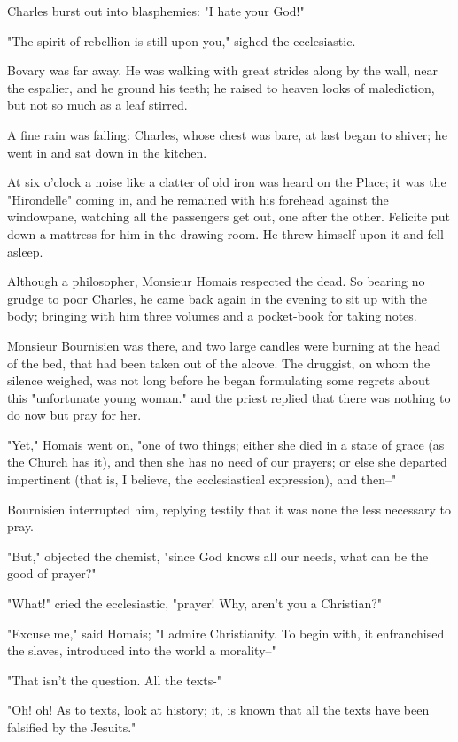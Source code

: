 \documentclass[11pt,twocolumn]{ltugboat}
\begin{document}
Charles burst out into blasphemies: "I hate your God!"

"The spirit of rebellion is still upon you," sighed the ecclesiastic.

Bovary was far away. He was walking with great strides along by the
wall, near the espalier, and he ground his teeth; he raised to heaven
looks of malediction, but not so much as a leaf stirred.

A fine rain was falling: Charles, whose chest was bare, at last began to
shiver; he went in and sat down in the kitchen.

At six o'clock a noise like a clatter of old iron was heard on the
Place; it was the "Hirondelle" coming in, and he remained with his
forehead against the windowpane, watching all the passengers get
out, one after the other. Felicite put down a mattress for him in the
drawing-room. He threw himself upon it and fell asleep.

Although a philosopher, Monsieur Homais respected the dead. So bearing
no grudge to poor Charles, he came back again in the evening to sit up
with the body; bringing with him three volumes and a pocket-book for
taking notes.

Monsieur Bournisien was there, and two large candles were burning at the
head of the bed, that had been taken out of the alcove. The druggist, on
whom the silence weighed, was not long before he began formulating some
regrets about this "unfortunate young woman." and the priest replied
that there was nothing to do now but pray for her.

"Yet," Homais went on, "one of two things; either she died in a state of
grace (as the Church has it), and then she has no need of our prayers;
or else she departed impertinent (that is, I believe, the ecclesiastical
expression), and then--"

Bournisien interrupted him, replying testily that it was none the less
necessary to pray.

"But," objected the chemist, "since God knows all our needs, what can be
the good of prayer?"

"What!" cried the ecclesiastic, "prayer! Why, aren't you a Christian?"

"Excuse me," said Homais; "I admire Christianity. To begin with, it
enfranchised the slaves, introduced into the world a morality--"

"That isn't the question. All the texts-"

"Oh! oh! As to texts, look at history; it, is known that all the texts
have been falsified by the Jesuits."
\end{document}
